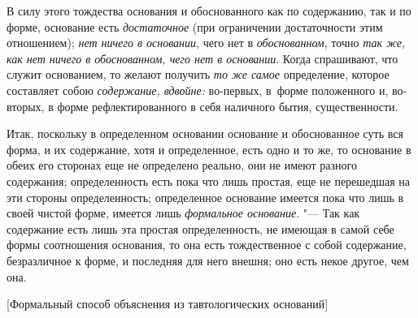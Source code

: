 В силу этого тождества основания и обоснованного как по содержанию, так и по
форме, основание есть {\em достаточное} (при ограничении достаточности этим
отношением); {\em нет ничего в основании}, чего нет в {\em обоснованном}, точно
{\em так же, как нет ничего в обоснованном, чего нет в основании}. Когда
спрашивают, что служит основанием, то желают получить {\em то же самое}
определение, которое составляет собою {\em содержание, вдвойне:} во-первых,
в~форме положенного и, во-вторых, в форме рефлектированного в себя наличного
бытия, существенности.

Итак, поскольку в определенном основании основание и обоснованное суть вся
форма, и их содержание, хотя и определенное, есть одно и то же, то основание в
обеих его сторонах еще не определено реально, они не имеют разного содержания;
определенность есть пока что лишь простая, еще не перешедшая на эти стороны
определенность; определенное основание имеется пока что лишь в своей чистой
форме, имеется лишь {\em формальное основание}. "--- Так как содержание есть
лишь эта простая определенность, не имеющая в самой себе формы соотношения
основания, то она есть тождественное с собой содержание, безразличное к форме,
и последняя для него внешня; оно есть некое другое, чем она.

%
{[Формальный способ объяснения из тавтологических оснований]}

